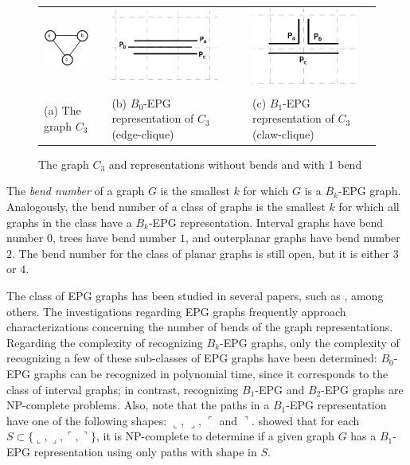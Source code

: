 \documentclass[12pt]{article}
\begin{document}
\begin{figure}[h]
  \centering
  \begin{tabular}{ p{3cm} p{0.7cm} p{4cm} p{0.7cm} p{4cm} }
    \includegraphics[width=2.3cm]{trianguloabc} && \includegraphics[width=3.5cm]{b0epgTransparenciaGrade2} & &
    \includegraphics[width=3.5cm]{b1EpgTransparenteGrade2}
    \\
    \footnotesize
    (a) The  graph $C_3$ && \footnotesize(b) $B_0$-EPG representation of $C_3$ (edge-clique)&& \footnotesize(c) $B_1$-EPG representation of $C_3$ (claw-clique)\\
  \end{tabular}

 \caption{The  graph $ C_3 $  and  representations without bends and with 1 bend} \label{fig:trianguloepgRepresentacao}
\end{figure}

The \emph{bend number} of a graph $G$ is the smallest $k$ for which $G$ is a $B_k$-EPG graph. Analogously, the bend number of a class of graphs is the smallest $k$ for which all graphs in the class have a $B_k$-EPG representation. Interval graphs have bend number $0$, trees have bend number $1$, and outerplanar graphs have bend number $2$. The bend number for the class of planar graphs is still open, but it is either $3$ or $4$.

The class of EPG graphs has been studied in several papers, such as \cite{alcon2016, Asinowski2009, cohen2014, golumbic2009}, among others. The investigations regarding EPG graphs frequently approach characterizations concerning the number of bends of the graph representations. Regarding the complexity of recognizing $B_k$-EPG graphs, only the complexity of recognizing a few of these sub-classes of EPG graphs have been determined: $B_0$-EPG graphs can be recognized in polynomial time, since it corresponds to the class of interval graphs; in contrast, recognizing $B_1$-EPG and $B_2$-EPG graphs are NP-complete problems. 
Also, note that the paths in a $B_1$-EPG representation have one of the following shapes: $\llcorner$, $\lrcorner$, $\ulcorner$ and $\urcorner$. \cite{cameron2016edge} showed that for each $S\subset \{\llcorner, \lrcorner, \ulcorner, \urcorner\}$, it is NP-complete to determine if a given graph $G$ has a $B_1$-EPG representation using only paths with shape in $S$.
\end{document}
